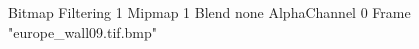 {Bitmap
	{Filtering 1}
	{Mipmap 1}
	{Blend none}
	{AlphaChannel 0}
	{Frame "europe_wall09.tif.bmp"}
}
